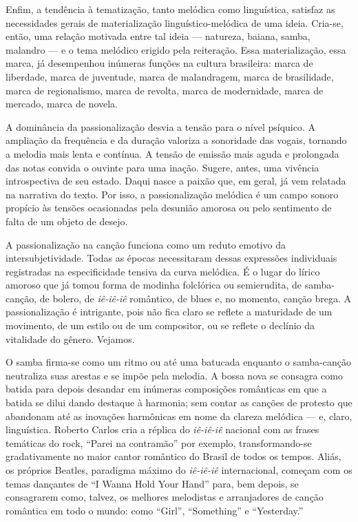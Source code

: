 Enfim, a
tendência à tematização, tanto melódica como linguística, satisfaz as
necessidades gerais de materialização linguístico-melódica de uma
ideia. Cria-se, então, uma relação motivada entre tal ideia --- natureza,
baiana, samba, malandro --- e o tema melódico erigido pela reiteração. Essa
materialização, essa marca, já desempenhou inúmeras funções na cultura
brasileira: marca de liberdade, marca de juventude, marca de
malandragem, marca de brasilidade, marca de regionalismo, marca de
revolta, marca de modernidade, marca de mercado, marca de novela.

A dominância da passionalização desvia a tensão para o nível psíquico. A
ampliação da frequência e da duração valoriza a sonoridade das vogais,
tornando a melodia mais lenta e contínua. A tensão de emissão mais aguda
e prolongada das notas convida o ouvinte para uma inação. Sugere, antes,
uma vivência introspectiva de seu estado. Daqui nasce a paixão que, em
geral, já vem relatada na narrativa do texto. Por isso, a
passionalização melódica é um campo sonoro propício às tensões
ocasionadas pela desunião amorosa ou pelo sentimento de falta de um
objeto de desejo.

A passionalização na canção funciona como um reduto emotivo da
intersubjetividade. Todas as épocas necessitaram dessas expressões
individuais registradas na especificidade tensiva da curva melódica. É o
lugar do lírico amoroso que já tomou forma de modinha folclórica ou
semierudita, de samba-canção, de bolero, de \textit{iê-iê-iê} romântico, de blues
e, no momento, canção brega. A passionalização é intrigante, pois não
fica claro se reflete a maturidade de um movimento, de um estilo ou de
um compositor, ou se reflete o declínio da vitalidade do gênero.
Vejamos.

O samba firma-se como um ritmo ou até uma batucada enquanto o
samba-canção neutraliza suas arestas e se impõe pela melodia. A bossa
nova se consagra como batida para depois desandar em inúmeras
composições românticas em que a batida se dilui dando destaque à
harmonia; sem contar as canções de protesto que abandonam até as
inovações harmônicas em nome da clareza melódica --- e, claro,
linguística. Roberto Carlos cria a réplica do \textit{iê-iê-iê} nacional com as
frases temáticas do rock, ``Parei na contramão'' por exemplo,
transformando-se gradativamente no maior cantor romântico do Brasil de
todos os tempos. Aliás, os próprios Beatles, paradigma máximo do
\textit{iê-iê-iê} internacional, começam com os temas dançantes de ``I Wanna Hold
Your Hand'' para, bem depois, se consagrarem como, talvez, os melhores
melodistas e arranjadores de canção romântica em todo o mundo: como ``Girl'',
``Something'' e ``Yesterday.''

